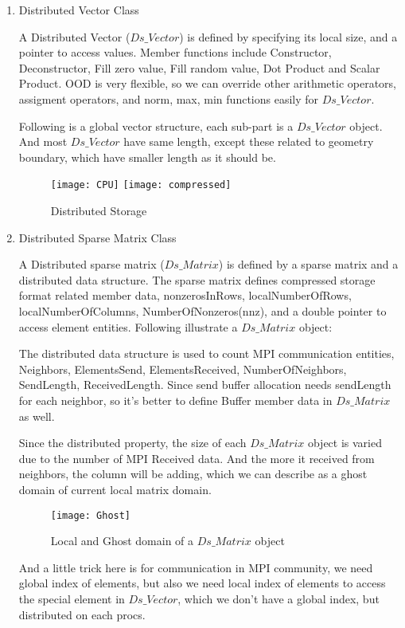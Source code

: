 \documentclass[11pt]{article}
\begin{document}
	\begin{enumerate}
	\item Distributed Vector Class 	

	A {\color{blue} Distributed Vector } ($Ds\_Vector$) is defined by specifying its local size, and a pointer to access values. Member functions include Constructor, Deconstructor, Fill zero value, Fill random value, Dot Product and Scalar Product. OOD is very flexible, so we can override other arithmetic operators, assigment operators, and norm, max, min functions easily for $Ds\_Vector$. 

	Following is a global vector structure, each sub-part is a $Ds\_Vector$ object. And most $Ds\_Vector$ have same length, except these related to geometry boundary, which have smaller length as it should be. 

\begin{figure}[h!]
\centerline
{
	\texttt{[image: CPU]}
	\texttt{[image: compressed]}
}
\caption{Distributed Storage}
\end{figure}


	\item Distributed Sparse Matrix Class 

	A {\color{blue} Distributed sparse matrix} ($Ds\_Matrix$) is defined by a sparse matrix and a distributed data structure. The sparse matrix defines compressed storage format related member data, nonzerosInRows, localNumberOfRows, localNumberOfColumns, NumberOfNonzeros(nnz), and a double pointer to access element entities. Following illustrate a $Ds\_Matrix$ object:

The distributed data structure is used to count MPI communication entities, Neighbors, ElementsSend, ElementsReceived, NumberOfNeighbors, SendLength, ReceivedLength. Since send buffer allocation needs sendLength for each neighbor, so it's better to define Buffer member data in $Ds\_Matrix$ as well.

Since the distributed property, the size of each $Ds\_Matrix$ object is varied due to the number of MPI Received data. And the  more it received from neighbors, the column will be adding, which we can describe as a ghost domain of current local matrix domain.
	
\begin{figure}[h]
	\centering
	\texttt{[image: Ghost]}
	\caption{Local and Ghost domain of a $Ds\_Matrix$ object}
\end{figure} 

And a little trick here is for communication in MPI community, we need global index of elements, but also we need local index of elements to access the special element in $Ds\_Vector$, which we don't have a global index, but distributed on each procs.  

	\end{enumerate}
\end{document}

